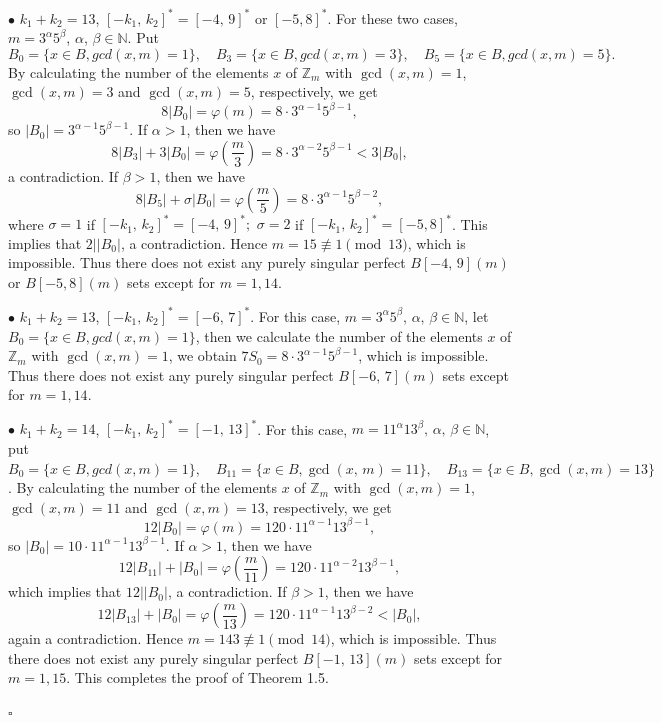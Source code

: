 \documentclass[12pt]{article}
\newtheorem{open problem}{Open problem}[section]
\newcommand{\qed}{\nopagebreak\hspace*{\fill}$\square$\par\vskip2mm}
\begin{document}
$\bullet$ $k_1+k_2=13$, $[-k_1, \,k_2]^*=[-4, \,9]^*$ or $[-5, 8]^\ast$. For these two cases, $m=3^\alpha5^\beta$,  $\alpha$,  $\beta\in\mathbb{N}$.  Put
$$B_0=\{x\in B, gcd(x, m)=1\}, \quad B_3=\{x\in B, gcd(x, m)=3\}, \quad B_5=\{x\in B, gcd(x, m)=5\}.$$
By calculating the number of the elements $x$ of $\mathbb{Z}_m$ with $\gcd(x, m)=1$, $\gcd(x, m)=3$ and $\gcd(x, m)=5$, respectively, we get
$$ 8|B_0|=\varphi(m)=8\cdot3^{\alpha-1}5^{\beta-1},$$
so $|B_0|=3^{\alpha-1}5^{\beta-1}$. If $\alpha>1$, then we have
$$8|B_3|+3|B_0|=\varphi(\frac{m}{3})=8\cdot3^{\alpha-2}5^{\beta-1}<3|B_0|,$$
a contradiction. If $\beta>1$, then we have
$$8|B_5|+\sigma|B_0|=\varphi(\frac{m}{5})=8\cdot3^{\alpha-1}5^{\beta-2},$$
where $\sigma=1$ if $[-k_1, \,k_2]^*=[-4, \,9]^*;$ $\sigma=2$ if $[-k_1, \,k_2]^*=[-5, 8]^\ast$.
This implies that $2||B_0|$, a contradiction.
Hence $m=15\not\equiv1\pmod{13}$, which is impossible. Thus there does not exist any purely singular perfect $B[-4, \,9](m)$ or $B[-5, 8](m)$ sets except for $m=1, 14$.

 $\bullet$ $k_1+k_2=13$, $[-k_1, \,k_2]^*=[-6, \,7]^*$. For this case, $m=3^\alpha5^\beta, \, \alpha, \, \beta\in\mathbb{N}$, let $B_0=\{x\in B, gcd(x, m)=1\}$, then we calculate the number of the elements $x$ of $\mathbb{Z}_m$ with $\gcd(x, m)=1$, we obtain $7S_0= 8\cdot 3^{\alpha-1}5^{\beta-1}$, which is impossible.
Thus there does not exist any purely singular perfect $B[-6, \,7](m)$ sets except for $m=1, 14$.

 $\bullet$ $k_1+k_2=14$, $[-k_1, \,k_2]^*=[-1, \,13]^*$. For this case, $m=11^\alpha13^\beta, \, \alpha, \, \beta\in\mathbb{N}$,  put
$B_0=\{x\in B, gcd(x, m)=1\}, \quad B_{11}=\{x\in B, \gcd(x, \,m)=11\}, \quad B_{13}=\{x\in B, \gcd(x, m)=13\}$.
By calculating the number of the elements $x$ of $\mathbb{Z}_m$ with $\gcd(x, m)=1$, $\gcd(x, m)=11$ and $\gcd(x, m)=13$, respectively, we get
$$ 12|B_0|=\varphi(m)=120\cdot11^{\alpha-1}13^{\beta-1},$$
so $|B_0|=10\cdot11^{\alpha-1}13^{\beta-1}$. If $\alpha>1$, then we have
$$12|B_{11}|+|B_0|=\varphi(\frac{m}{11})=120\cdot11^{\alpha-2}13^{\beta-1},$$
which implies that $12||B_0|$, a contradiction. If $\beta>1$, then we have
$$12|B_{13}|+|B_0|=\varphi(\frac{m}{13})=120\cdot11^{\alpha-1}13^{\beta-2}<|B_0|,$$
 again a contradiction.  Hence $m=143\not\equiv1\pmod{14}$, which is impossible. Thus there does not exist any purely singular perfect $B[-1, \,13](m)$  sets except for $m=1, 15$.
This completes the proof of Theorem 1.5.

\qed
\end{document}
